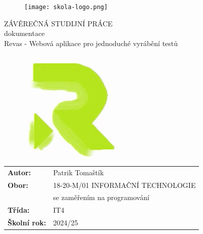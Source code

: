 \documentclass[12pt, a4paper, twoside, openright]{report}
\title{\nazevPrace} %
\author{\jmenoAutora} %
\date{\datumOdevzdani} %
\newcommand\obor{INFORMAČNÍ TECHNOLOGIE} %
\newcommand\kodOboru{18-20-M/01} %
\newcommand\zamereni{se zaměřením na programování} %
\newcommand\trida{IT4} %
\newcommand\jmenoAutora{Patrik Tomaštík}  %
\newcommand\skolniRok{2024/25} %
\newcommand\nazevPrace{Revas - Webová aplikace pro jednoduché vyrábění testů}
\begin{document}
	
	\pagestyle{empty}
	
	\cleardoublepage

	
	{\selectfont
		\begin{figure}[h]
			\centering
			\texttt{[image: skola-logo.png]}
		\end{figure}
		
		
		{\bfseries %
			\begin{center}
				\vspace{0.025 \textheight}
				\LARGE{ZÁVĚREČNÁ STUDIJNÍ PRÁCE}\\
				\large{dokumentace}\\
				\vspace{0.075 \textheight}
				\LARGE {\nazevPrace}\\
			\end{center}  
		}%
		
		\begin{figure}[h]
			\centering
			\includegraphics[width=0.5\linewidth]{logoRevas.png}
			\label{fig:main-screen}
		\end{figure}
		
		\vspace{0.02 \textheight}
		\begin{table}[h!]
			\begin{tabular}{ll}
				\textbf{Autor:} & \jmenoAutora\\ 
				\textbf{Obor:} & \kodOboru { } \obor\\
				\textbf{} & \zamereni\\
				\textbf{Třída:} & \trida\\
				\textbf{Školní rok:} & \skolniRok\\
			\end{tabular}
			
		\end{table}		
	}
	
\end{document}
